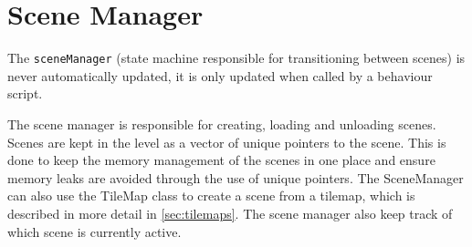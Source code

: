 \section{Scene Manager}
\label{sec:sceneManager}
The \texttt{sceneManager} (state machine responsible for transitioning between scenes) is never automatically updated, it is only updated when called by a behaviour script.

\noindent The scene manager is responsible for creating, loading and unloading scenes.
Scenes are kept in the level as a vector of unique pointers to the scene.
This is done to keep the memory management of the scenes in one place and ensure memory leaks are avoided through the use of unique pointers.
The SceneManager can also use the TileMap class to create a scene from a tilemap, which is described in more detail in \autoref{sec:tilemaps}.
The scene manager also keep track of which scene is currently active.